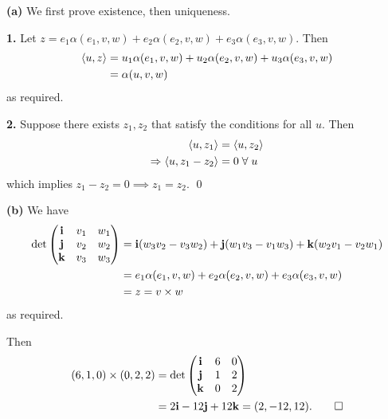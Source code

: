 \documentclass[a4paper, 12pt]{article}
\begin{document}
\begin{solution}
    \textbf{(a)} We first prove existence, then uniqueness.

    \textbf{1.} Let $z = e_1 \alpha(e_1, v, w) + e_2 \alpha(e_2, v, w) + e_3 \alpha(e_3, v, w)$. Then \begin{align*}
        \langle u, z \rangle & = u_1 \alpha(e_1, v, w) + u_2 \alpha(e_2, v, w) + u_3 \alpha(e_3, v, w) \\
                     & = \alpha(u, v, w)
    \end{align*}
    as required.

    \textbf{2.} Suppose there exists $z_1, z_2$ that satisfy the conditions for all $u$. Then \begin{align*}
        \iprod{u}{z_1}                & = \iprod{u}{z_2} \\
        \implies \iprod{u}{z_1 - z_2} & = 0 \forall u
    \end{align*}
    which implies $z_1 - z_2 = 0 \implies z_1 = z_2$. \qed

    \textbf{(b)} We have \begin{align*}
        \det \begin{pmatrix} {\bf i} & v_1 & w_1 \\
                {\bf j} & v_2 & w_2 \\
                {\bf k} & v_3 & w_3 \\
             \end{pmatrix} & = {\bf i}(w_3v_2 - v_3w_2) + {\bf j}(w_1v_3 - v_1w_3) + {\bf k}(w_2v_1 - v_2w_1)                \\
                                                    & = e_1\alpha(e_1, v, w) + e_2 \alpha(e_2, v, w) + e_3 \alpha(e_3, v, w) \\
                                                    & = z = v \times w
    \end{align*}
    as required.

    Then \begin{align*}
        (6, 1, 0) \times (0, 2, 2) & = \det
        \begin{pmatrix}
            {\bf i} & 6 & 0 \\
            {\bf j} & 1 & 2 \\
            {\bf k} & 0 & 2
        \end{pmatrix}                                                                         \\
                                   & = 2 {\bf i} - 12 {\bf j} + 12 {\bf k} = (2, -12, 12). \qed
    \end{align*}


\end{solution}
\end{document}
